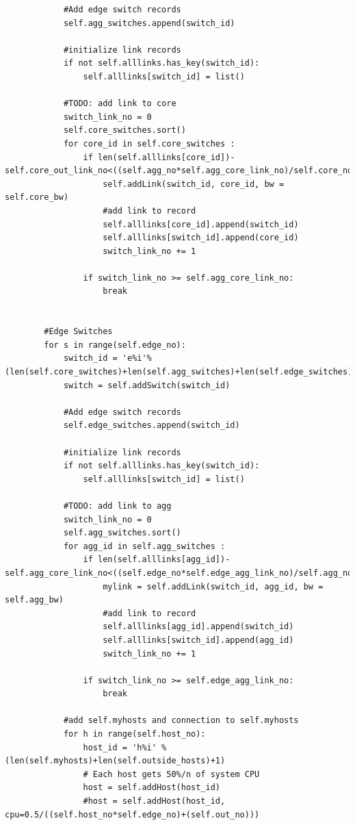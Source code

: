 \documentclass[12pt,english,oneside]{book}
\begin{document}
\begin{lstlisting}
            #Add edge switch records
            self.agg_switches.append(switch_id)
            
            #initialize link records
            if not self.alllinks.has_key(switch_id):
                self.alllinks[switch_id] = list()
            
            #TODO: add link to core
            switch_link_no = 0
            self.core_switches.sort()
            for core_id in self.core_switches :
                if len(self.alllinks[core_id])-self.core_out_link_no<((self.agg_no*self.agg_core_link_no)/self.core_no):
                    self.addLink(switch_id, core_id, bw = self.core_bw)
                    #add link to record
                    self.alllinks[core_id].append(switch_id)
                    self.alllinks[switch_id].append(core_id)
                    switch_link_no += 1
                    
                if switch_link_no >= self.agg_core_link_no:
                    break

                    
        #Edge Switches
        for s in range(self.edge_no):
            switch_id = 'e%i'%(len(self.core_switches)+len(self.agg_switches)+len(self.edge_switches)+1)
            switch = self.addSwitch(switch_id)
            
            #Add edge switch records
            self.edge_switches.append(switch_id)
            
            #initialize link records
            if not self.alllinks.has_key(switch_id):
                self.alllinks[switch_id] = list()
            
            #TODO: add link to agg
            switch_link_no = 0
            self.agg_switches.sort()
            for agg_id in self.agg_switches :
                if len(self.alllinks[agg_id])-self.agg_core_link_no<((self.edge_no*self.edge_agg_link_no)/self.agg_no):
                    mylink = self.addLink(switch_id, agg_id, bw = self.agg_bw)
                    #add link to record
                    self.alllinks[agg_id].append(switch_id)
                    self.alllinks[switch_id].append(agg_id)
                    switch_link_no += 1
                    
                if switch_link_no >= self.edge_agg_link_no:
                    break
            
            #add self.myhosts and connection to self.myhosts
            for h in range(self.host_no):
                host_id = 'h%i' % (len(self.myhosts)+len(self.outside_hosts)+1)
                # Each host gets 50%/n of system CPU
                host = self.addHost(host_id)
                #host = self.addHost(host_id, cpu=0.5/((self.host_no*self.edge_no)+(self.out_no)))
                

\end{lstlisting}
\end{document}
